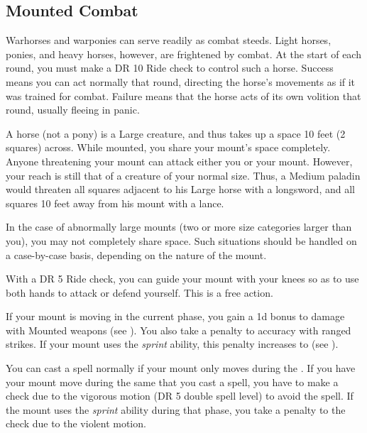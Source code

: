     \subsection{Mounted Combat}\label{Mounted Combat}
         Warhorses and warponies can serve readily as combat steeds. Light horses, ponies, and heavy horses, however, are frightened by combat.
        At the start of each round, you must make a DR 10 Ride check to control such a horse.
        Success means you can act normally that round, directing the horse's movements as if it was trained for combat.
        Failure means that the horse acts of its own volition that round, usually fleeing in panic.

         A horse (not a pony) is a Large creature, and thus takes up a space 10 feet (2 squares) across. While mounted, you share your mount's space completely. Anyone threatening your mount can attack either you or your mount. However, your reach is still that of a creature of your normal size. Thus, a Medium paladin would threaten all squares adjacent to his Large horse with a longsword, and all squares 10 feet away from his mount with a lance.

        In the case of abnormally large mounts (two or more size categories larger than you), you may not completely share space. Such situations should be handled on a case-by-case basis, depending on the nature of the mount.

         With a DR 5 Ride check, you can guide your mount with your knees so as to use both hands to attack or defend yourself. This is a free action.

        If your mount is moving in the current phase, you gain a \plus1d bonus to damage with Mounted weapons (see ).
        You also take a  penalty to accuracy with ranged strikes.
        If your mount uses the \textit{sprint} ability, this penalty increases to  (see ).

         You can cast a spell normally if your mount only moves during the .
        If you have your mount move during the same  that you cast a spell, you have to make a  check due to the vigorous motion (DR 5 \add double spell level) to avoid  the spell.
        If the mount uses the \textit{sprint} ability during that phase, you take a  penalty to the check due to the violent motion.

